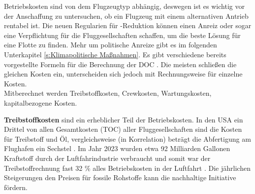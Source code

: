 Betriebskosten sind von dem Flugzeugtyp abhängig, deswegen ist es wichtig vor der Anschaffung zu untersuchen, 
ob ein Flugzeug mit einem alternativen Antrieb rentabel ist. Die neuen Regularien für -Reduktion können einen Anreiz oder sogar 
eine Verpflichtung für die Fluggesellschaften schaffen, um die beste Lösung für eine Flotte zu finden. 
Mehr um politische Anreize gibt es im folgenden Unterkapitel \ref{s:Klimapolitische Maßnahmen}.
%
Es gibt verschiedene bereits vorgestellte Formeln für die Berechnung der DOC \cite{scholz_design_evaluation_doc}. 
Die meisten schließen die gleichen Kosten ein, 
unterscheiden sich jedoch mit Rechnungsweise für einzelne Kosten.\\ 
Mitberechnet werden Treibstoffkosten, Crewkosten, Wartungskosten, kapitalbezogene Kosten.

%
\textbf{Treibstoffkosten} sind ein erheblicher Teil der Betriebskosten. In den USA ein Drittel von allen Gesamtkosten (TOC) aller 
Fluggesellschaften sind die Kosten für Treibstoff und Öl, vergleichsweise (in Korrelation) beträgt die Abfertigung am Flughafen ein Sechstel 
\cite{conrady2019luftverkehr}. 
Im Jahr 2023 wurden etwa 92 Milliarden Gallonen Kraftstoff durch der Luftfahrindustrie verbraucht und somit
war der Treibstoffrechnung fast 32 \% alles Betriebskosten in der Luftfahrt \cite{iata_industry_statistics_2024}.
Die jährlichen Steigerungen den Preisen für fossile Rohstoffe kann die nachhaltige Initiative fördern. \\
%
%
